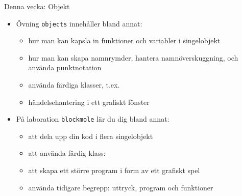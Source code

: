 

\ifkompendium\else



\begin{SlideExtra}{Denna vecka: Objekt}
\begin{itemize}\SlideFontSmall
\item Övning \texttt{objects} innehåller bland annat:
\begin{itemize}\SlideFontTiny
\item hur man kan kapsla in funktioner och variabler i singelobjekt
\item hur man kan skapa namnrymder, hantera namnöverskuggning, och använda punktnotation
\item använda färdiga klasser, t.ex. 
\item händelsehantering i ett grafiskt fönster
\end{itemize}

\item På laboration \texttt{blockmole} lär du dig bland annat:
\begin{itemize}\SlideFontTiny
  \item att dela upp din kod i flera singelobjekt
  \item att använda färdig klass: 
  \item att skapa ett större program i form av ett grafiskt spel
  \item använda tidigare begrepp: uttryck, program och funktioner
\end{itemize}


\end{itemize}
\end{SlideExtra}
